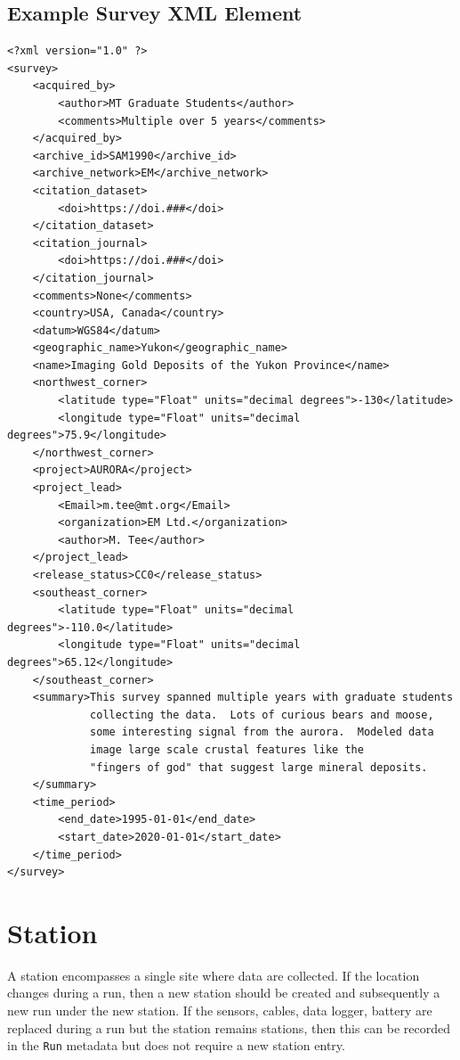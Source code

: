 \documentclass[12pt]{article}
\begin{document}
\clearpage
\newpage
\subsection{Example Survey XML Element}

\begin{verbatim}
<?xml version="1.0" ?>
<survey>
    <acquired_by>
        <author>MT Graduate Students</author>
        <comments>Multiple over 5 years</comments>
    </acquired_by>
    <archive_id>SAM1990</archive_id>
    <archive_network>EM</archive_network>
    <citation_dataset>
        <doi>https://doi.###</doi>
    </citation_dataset>
    <citation_journal>
        <doi>https://doi.###</doi>
    </citation_journal>
    <comments>None</comments>
    <country>USA, Canada</country>
    <datum>WGS84</datum>
    <geographic_name>Yukon</geographic_name>
    <name>Imaging Gold Deposits of the Yukon Province</name>
    <northwest_corner>
        <latitude type="Float" units="decimal degrees">-130</latitude>
        <longitude type="Float" units="decimal degrees">75.9</longitude>
    </northwest_corner>
    <project>AURORA</project>
    <project_lead>
        <Email>m.tee@mt.org</Email>
        <organization>EM Ltd.</organization>
        <author>M. Tee</author>
    </project_lead>
    <release_status>CC0</release_status>
    <southeast_corner>
        <latitude type="Float" units="decimal degrees">-110.0</latitude>
        <longitude type="Float" units="decimal degrees">65.12</longitude>
    </southeast_corner>
    <summary>This survey spanned multiple years with graduate students
             collecting the data.  Lots of curious bears and moose,
             some interesting signal from the aurora.  Modeled data
             image large scale crustal features like the 
             "fingers of god" that suggest large mineral deposits.
    </summary>
    <time_period>
        <end_date>1995-01-01</end_date>
        <start_date>2020-01-01</start_date>
    </time_period>
</survey>
\end{verbatim}

\clearpage
\newpage
\section{Station}

A station encompasses a single site where data are collected. If the location changes during a run, then a new station should be created and subsequently a new run under the new station. If the sensors, cables, data logger, battery are replaced during a run but the station remains stations, then this can be recorded in the \verb|Run| metadata but does not require a new station entry.
\end{document}
